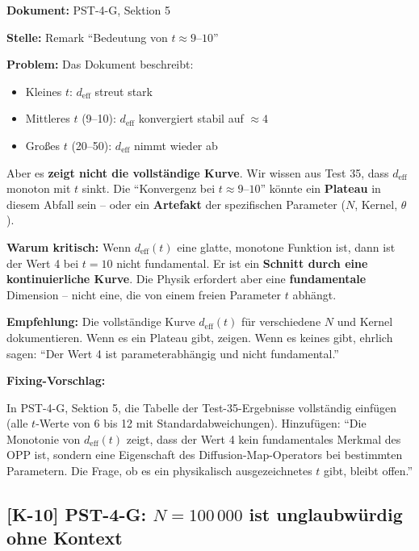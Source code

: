 \documentclass[11pt,a4paper]{article}
\newcommand{\K}[1]{\textbf{[K-#1]}}
\newcommand{\Dok}[1]{\noindent\textbf{Dokument:} #1\par\smallskip}
\newcommand{\Stelle}[1]{\noindent\textbf{Stelle:} #1\par\smallskip}
\newcommand{\Prob}[1]{\noindent\textbf{Problem:} #1\par\smallskip}
\newcommand{\Krit}[1]{\noindent\textbf{Warum kritisch:} #1\par\smallskip}
\newcommand{\Empf}[1]{\noindent\textbf{Empfehlung:} #1\par\smallskip}
\newenvironment{Fix}
  {\par\medskip\noindent\textbf{Fixing-Vorschlag:}\par\nobreak\smallskip}
  {\par\medskip}
\begin{document}
\Dok{PST-4-G, Sektion 5}
\Stelle{Remark ``Bedeutung von $t \approx 9$--$10$''}
\Prob{Das Dokument beschreibt:
\begin{itemize}
  \item Kleines $t$: $d_{\text{eff}}$ streut stark
  \item Mittleres $t$ (9--10): $d_{\text{eff}}$ konvergiert stabil auf $\approx 4$
  \item Großes $t$ (20--50): $d_{\text{eff}}$ nimmt wieder ab
\end{itemize}
Aber es \textbf{zeigt nicht die vollständige Kurve}. Wir wissen aus
Test 35, dass $d_{\text{eff}}$ monoton mit $t$ sinkt. Die
``Konvergenz bei $t \approx 9$--$10$'' könnte ein \textbf{Plateau}
in diesem Abfall sein -- oder ein \textbf{Artefakt} der spezifischen
Parameter ($N$, Kernel, $\theta$).}
\Krit{Wenn $d_{\text{eff}}(t)$ eine glatte, monotone Funktion ist,
dann ist der Wert 4 bei $t = 10$ nicht fundamental. Er ist ein
\textbf{Schnitt durch eine kontinuierliche Kurve}. Die Physik erfordert
aber eine \textbf{fundamentale} Dimension -- nicht eine, die von einem
freien Parameter $t$ abhängt.}
\Empf{Die vollständige Kurve $d_{\text{eff}}(t)$ für
verschiedene $N$ und Kernel dokumentieren. Wenn es ein Plateau gibt,
zeigen. Wenn es keines gibt, ehrlich sagen: ``Der Wert 4 ist
parameterabhängig und nicht fundamental.''}
\begin{Fix}
In PST-4-G, Sektion 5, die Tabelle der Test-35-Ergebnisse
vollständig einfügen (alle $t$-Werte von 6 bis 12 mit
Standardabweichungen). Hinzufügen: ``Die Monotonie von
$d_{\text{eff}}(t)$ zeigt, dass der Wert 4 kein fundamentales
Merkmal des OPP ist, sondern eine Eigenschaft des
Diffusion-Map-Operators bei bestimmten Parametern. Die Frage,
ob es ein physikalisch ausgezeichnetes $t$ gibt, bleibt offen.''
\end{Fix}

\subsection{\K{10} PST-4-G: $N = 100\,000$ ist unglaubwürdig ohne Kontext}
\end{document}
